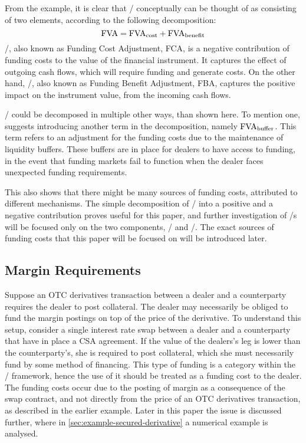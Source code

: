 \documentclass[main.tex]{subfiles}
\begin{document}
        From the example, it is clear that \FVA/ conceptually can be thought of 
        as consisting of two elements, according to the following decomposition:
        \begin{equation*}
            \FVA/ = \FCA/ + \FBA/
        \end{equation*}
        \FCA/, also known as Funding Cost Adjustment, FCA, 
        is a negative contribution of funding costs to the value of the financial instrument.
        It captures the effect of outgoing cash flows, which will require funding and generate costs.
        On the other hand, \FBA/, also known as Funding Benefit Adjustment, FBA, 
        captures the positive impact on the instrument value, from the incoming cash flows.

        \FVA/ could be decomposed in multiple other ways, than shown here. 
        To mention one, \textcite{KPMGFVA} suggests introducing another term in the decomposition, 
        namely $\FVA/_{\text{buffer}}$.
        This term refers to an adjustment for the funding costs
        due to the maintenance of liquidity buffers. 
        These buffers are in place for dealers to have access to funding, in the event
        that funding markets fail to function when the dealer faces unexpected funding requirements.

        This also shows that there might be many sources of funding costs,
        attributed to different mechanisms.
        The simple decomposition of \FVA/ into a positive and a negative contribution
        proves useful for this paper,
        and further investigation of \FVA/s will be focused only on the two components,
        \FCA/ and \FBA/.
        The exact sources of funding costs that this paper will be focused on
        will be introduced later.

        \subsection*{Margin Requirements}
            Suppose an OTC derivatives transaction between a dealer 
            and a counterparty requires the dealer to post collateral.
            The dealer may necessarily be obliged to fund the margin postings on top of the price of the derivative.
            To understand this setup,
            consider a single interest rate swap between a dealer and a counterparty that have in place a CSA agreement.
            If the value of the dealers's leg is lower than the counterparty's,
            she is required to post collateral, 
            which she must necessarily fund by some method of financing.
            This type of funding is a category within the \FVA/ framework, 
            hence the use of it should be treated as a funding cost to the dealer.
            The funding costs occur due to the posting of margin as a consequence of the swap contract,
            and not directly from the price of an OTC derivatives transaction,
            as described in the earlier example.
            Later in this paper the issue is discussed further, 
            where in \cref{sec:example-secured-derivative} a numerical example is analysed.
            
\end{document}
